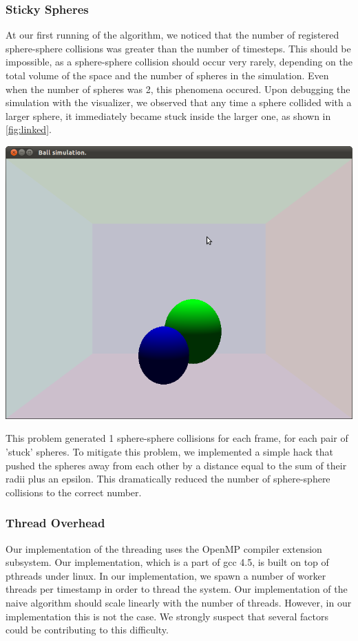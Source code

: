 \documentclass[conference]{IEEEtran}
\begin{document}
\subsubsection{Sticky Spheres}
At our first running of the algorithm, we noticed that the number of registered sphere-sphere collisions was greater than the number of timesteps.  This should be impossible, as a sphere-sphere collision should
occur very rarely, depending on the total volume of the space and the number of spheres in the simulation.  Even when the number of spheres was 2, this phenomena occured.  Upon debugging the simulation with the visualizer,
we observed that any time a sphere collided with a larger sphere, it immediately became stuck inside the larger one, as shown in \ref{fig:linked}.  

\begin{center}
	\includegraphics[width=.45\textwidth]{linked.png}
	\label{fig:linked}
\end{center}

This problem generated 1 sphere-sphere collisions for each frame, for each pair of 'stuck' spheres.  To mitigate this problem, we implemented a simple hack that pushed the spheres away from each other by a distance equal to the sum of their radii plus an epsilon.
This dramatically reduced the number of sphere-sphere collisions to the correct number.

\subsubsection{Thread Overhead}
	Our implementation of the threading uses the OpenMP compiler extension subsystem.  Our implementation, which is a part of gcc 4.5, is built on top of pthreads under linux.  In our implementation, we 
spawn a number of worker threads per timestamp in order to thread the system.  Our implementation of the naive algorithm should scale linearly with the number of threads.  However, in our implementation this is not the case.  We strongly suspect that
several factors could be contributing to this difficulty.  
\end{document}

